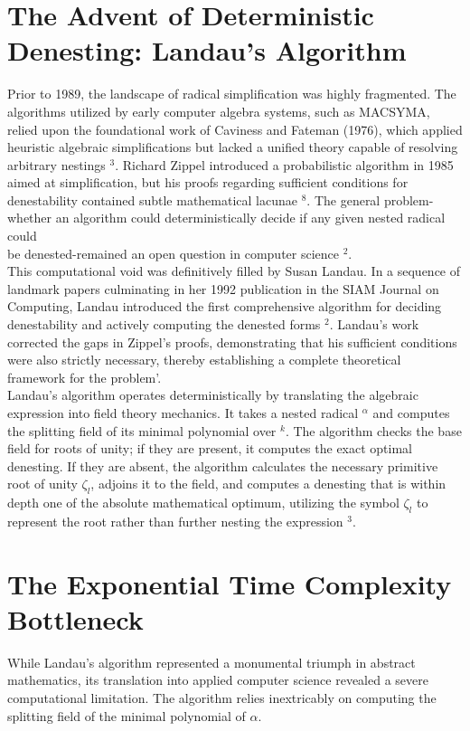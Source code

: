 \documentclass[10pt]{article}
\begin{document}
\section*{The Advent of Deterministic Denesting: Landau's Algorithm}
Prior to 1989, the landscape of radical simplification was highly fragmented. The algorithms utilized by early computer algebra systems, such as MACSYMA, relied upon the foundational work of Caviness and Fateman (1976), which applied heuristic algebraic simplifications but lacked a unified theory capable of resolving arbitrary nestings ${ }^{3}$. Richard Zippel introduced a probabilistic algorithm in 1985 aimed at simplification, but his proofs regarding sufficient conditions for denestability contained subtle mathematical lacunae ${ }^{8}$. The general problem-whether an algorithm could deterministically decide if any given nested radical could\\
be denested-remained an open question in computer science ${ }^{2}$.\\
This computational void was definitively filled by Susan Landau. In a sequence of landmark papers culminating in her 1992 publication in the SIAM Journal on Computing, Landau introduced the first comprehensive algorithm for deciding denestability and actively computing the denested forms ${ }^{2}$. Landau's work corrected the gaps in Zippel's proofs, demonstrating that his sufficient conditions were also strictly necessary, thereby establishing a complete theoretical framework for the problem'.\\
Landau's algorithm operates deterministically by translating the algebraic expression into field theory mechanics. It takes a nested radical ${ }^{\alpha}$ and computes the splitting field of its minimal polynomial over ${ }^{k}$. The algorithm checks the base field for roots of unity; if they are present, it computes the exact optimal denesting. If they are absent, the algorithm calculates the necessary primitive root of unity $\zeta_{l}$, adjoins it to the field, and computes a denesting that is within depth one of the absolute mathematical optimum, utilizing the symbol $\zeta_{l}$ to represent the root rather than further nesting the expression ${ }^{3}$.

\section*{The Exponential Time Complexity Bottleneck}
While Landau's algorithm represented a monumental triumph in abstract mathematics, its translation into applied computer science revealed a severe computational limitation. The algorithm relies inextricably on computing the splitting field of the minimal polynomial of $\alpha$.
\end{document}

